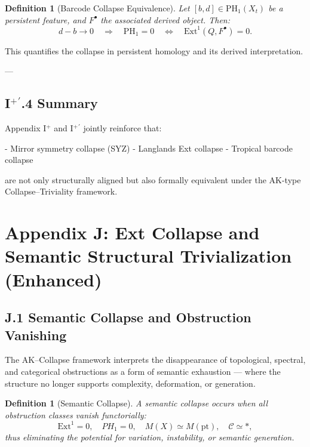 \documentclass[11pt]{article}
\newtheorem{definition}[theorem]{Definition}
\begin{document}
\begin{definition}[Barcode Collapse Equivalence]
Let $[b,d] \in \mathrm{PH}_1(X_t)$ be a persistent feature, and $F^\bullet$ the associated derived object. Then:
\[
d - b \to 0 \quad \Rightarrow \quad \mathrm{PH}_1 = 0 \quad \Leftrightarrow \quad \mathrm{Ext}^1(Q, F^\bullet) = 0.
\]
\end{definition}

This quantifies the collapse in persistent homology and its derived interpretation.

---

\subsection*{I$^+\!{}^\prime$.4 Summary}

Appendix I$^+$ and I$^+\!{}^\prime$ jointly reinforce that:

- Mirror symmetry collapse (SYZ)  
- Langlands Ext collapse  
- Tropical barcode collapse  

are not only structurally aligned but also formally equivalent  
under the AK-type Collapse–Triviality framework.





\section*{Appendix J: Ext Collapse and Semantic Structural Trivialization (Enhanced)}

\subsection*{J.1 Semantic Collapse and Obstruction Vanishing}

The AK–Collapse framework interprets the disappearance of topological, spectral, and categorical obstructions  
as a form of semantic exhaustion — where the structure no longer supports complexity, deformation, or generation.

\begin{definition}[Semantic Collapse]
A semantic collapse occurs when all obstruction classes vanish functorially:
\[
\mathrm{Ext}^1 = 0, \quad PH_1 = 0, \quad M(X) \simeq M(\mathrm{pt}), \quad \mathcal{C} \simeq \ast,
\]
thus eliminating the potential for variation, instability, or semantic generation.
\end{definition}
\end{document}
